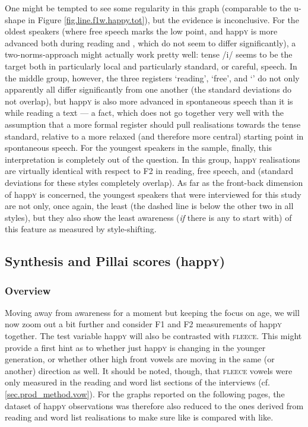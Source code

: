 One might be tempted to see some regularity in this graph (comparable to the u-shape in Figure \ref{fig.line.f1w.happy.tot}), but the evidence is inconclusive.
For the oldest speakers (where free speech marks the low point, and happ\textsc{y} is more advanced both during reading and , which do not seem to differ significantly), a two-norms-approach might actually work pretty well: tense /i/ seems to be the target both in particularly local and particularly standard, or careful, speech.
In the middle group, however, the three registers `reading', `free', and `' do not only apparently all differ significantly from one another (the standard deviations do not overlap), but happ\textsc{y} is also more advanced in spontaneous speech than it is while reading a text --- a fact, which does not go together very well with the assumption that a more formal register should pull realisations towards the tense standard, relative to a more relaxed (and therefore more central) starting point in spontaneous speech.
For the youngest speakers in the sample, finally, this interpretation is completely out of the question.
In this group, happ\textsc{y} realisations are virtually identical with respect to F2 in reading, free speech, and  (standard deviations for these styles completely overlap).
As far as the front-back dimension of happ\textsc{y} is concerned, the youngest speakers that were interviewed for this study are not only, once again, the least  (the dashed line is below the other two in all styles), but they also show the least awareness (\emph{if} there is any to start with) of this feature as measured by style-shifting.

\subsection{Synthesis and Pillai scores (happ\textrm{\textsc{y}})}
\label{sec.prod.res.vow.happy.pil}

\subsubsection{Overview}

Moving away from awareness for a moment but keeping the focus on age, we will now zoom out a bit further and consider F1 and F2 measurements of happ\textsc{y} together.
The test variable happ\textsc{y} will also be contrasted with \textsc{fleece}.
This might provide a first hint as to whether just happ\textsc{y} is changing in the younger generation, or whether other high front vowels are moving in the same (or another) direction as well.
It should be noted, though, that \textsc{fleece} vowels were only measured in the reading and word list sections of the interviews (cf. \ref{sec.prod_method.vow}).
For the graphs reported on the following pages, the dataset of happ\textsc{y} observations was therefore also reduced to the ones derived from reading and word list realisations to make sure like is compared with like.

